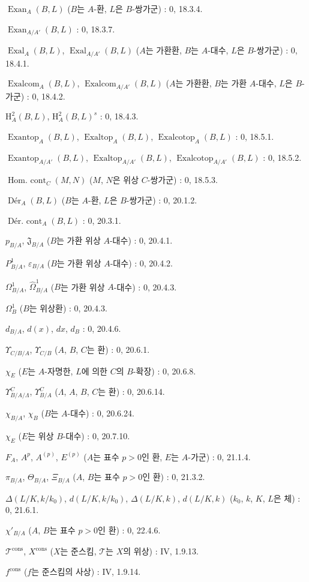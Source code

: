 $\operatorname{Exan}_A(B,L)$ ($B$는 $A$-환, $L$은 $B$-쌍가군) : 0, 18.3.4.\par
$\operatorname{Exan}_{A/A'}(B,L)$ : 0, 18.3.7.\par
$\operatorname{Exal}_A(B,L)$, $\operatorname{Exal}_{A/A'}(B,L)$ ($A$는
가환환, $B$는 $A$-대수, $L$은 $B$-쌍가군) : 0, 18.4.1.\par
$\operatorname{Exalcom}_A(B,L)$, $\operatorname{Exalcom}_{A/A'}(B,L)$
($A$는 가환환, $B$는 가환 $A$-대수, $L$은 $B$-가군) : 0, 18.4.2.\par
$\mathrm H_A^2(B,L)$, $\mathrm H_A^2(B,L)^s$ : 0, 18.4.3.\par
$\operatorname{Exantop}_A(B,L)$, $\operatorname{Exaltop}_A(B,L)$,
$\operatorname{Exalcotop}_A(B,L)$ : 0, 18.5.1.\par
$\operatorname{Exantop}_{A/A'}(B,L)$, $\operatorname{Exaltop}_{A/A'}(B,L)$,
$\operatorname{Exalcotop}_{A/A'}(B,L)$ : 0, 18.5.2.\par
$\operatorname{Hom.\ cont}_C(M,N)$ ($M$, $N$은 위상 $C$-쌍가군) : 0, 18.5.3.\par
$\operatorname{Dér}_A(B,L)$ ($B$는 $A$-환, $L$은 $B$-쌍가군) : 0, 20.1.2.\par
$\operatorname{Dér.\ cont}_A(B,L)$ : 0, 20.3.1.\par
$p_{B/A}$, $\mathfrak J_{B/A}$ ($B$는 가환 위상 $A$-대수) : 0, 20.4.1.\par
$P^1_{B/A}$, $\varepsilon_{B/A}$ ($B$는 가환 위상 $A$-대수) : 0, 20.4.2.\par
$\Omega^1_{B/A}$, $\widehat{\Omega}^1_{B/A}$ ($B$는 가환 위상 $A$-대수) : 0, 20.4.3.\par
$\Omega^1_B$ ($B$는 위상환) : 0, 20.4.3.\par
$d_{B/A}$, $d(x)$, $dx$, $d_B$ : 0, 20.4.6.\par
$\Upsilon_{C/B/A}$, $\Upsilon_{C/B}$ ($A$, $B$, $C$는 환) : 0, 20.6.1.\par
$\chi_E$ ($E$는 $A$-자명한, $L$에 의한 $C$의 $B$-확장) : 0, 20.6.8.\par

\clearpage
{}
$\Upsilon^C_{B/A/\Lambda}$, $\Upsilon^C_{B/A}$ ($\Lambda$, $A$, $B$, $C$는 환) : 0, 20.6.14.\par
$\chi_{B/A}$, $\chi_B$ ($B$는 $A$-대수) : 0, 20.6.24.\par
$\chi_E$ ($E$는 위상 $B$-대수) : 0, 20.7.10.\par
$F_A$, $A^p$, $A^{(p)}$, $E^{(p)}$ ($A$는 표수 $p>0$인 환,
$E$는 $A$-가군) : 0, 21.1.4.\par
$\pi_{B/A}$, $\Theta_{B/A}$, $\Xi_{B/A}$ ($A$, $B$는 표수 $p>0$인 환) : 0, 21.3.2.\par
$\Delta(L/K,k/k_0)$, $d(L/K,k/k_0)$, $\Delta(L/K,k)$, $d(L/K,k)$
($k_0$, $k$, $K$, $L$은 체) : 0, 21.6.1.\par
$\chi'_{B/A}$ ($A$, $B$는 표수 $p>0$인 환) : 0, 22.4.6.\par
$\mathscr T^{\mathrm{cons}}$, $X^{\mathrm{cons}}$ ($X$는 준스킴,
$\mathscr T$는 $X$의 위상) : IV, 1.9.13.\par
$f^{\mathrm{cons}}$ ($f$는 준스킴의 사상) : IV, 1.9.14.\par

